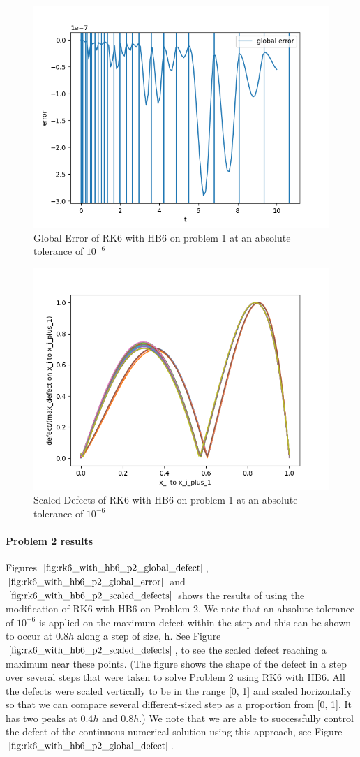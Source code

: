 \documentclass{article}
\begin{document}
\begin{figure}[H]
\centering
\includegraphics[width=0.7\linewidth]{./figures/rk6_with_hb6_p1_global_error}
\caption{Global Error of RK6 with HB6 on problem 1 at an absolute tolerance of $10^{-6}$}
\label{fig:rk6_with_hb6_p1_global_error}
\end{figure}

\begin{figure}[H]
\centering
\includegraphics[width=0.7\linewidth]{./figures/rk6_with_hb6_p1_scaled_defects}
\caption{Scaled Defects of RK6 with HB6 on problem 1 at an absolute tolerance of $10^{-6}$}
\label{fig:rk6_with_hb6_p1_scaled_defects}
\end{figure}

\paragraph{Problem 2 results}
Figures $\ref{fig:rk6_with_hb6_p2_global_defect}$, $\ref{fig:rk6_with_hb6_p2_global_error}$ and $\ref{fig:rk6_with_hb6_p2_scaled_defects}$ shows the results of using the modification of RK6 with HB6 on Problem 2. We note that an absolute tolerance of $10^{-6}$ is applied on the maximum defect within the step and this can be shown to occur at $0.8h$ along a step of size, h. See Figure $\ref{fig:rk6_with_hb6_p2_scaled_defects}$, to see the scaled defect reaching a maximum near these points. (The figure shows the shape of the defect in a step over several steps that were taken to solve Problem 2 using RK6 with HB6. All the defects were scaled vertically to be in the range [0, 1] and scaled horizontally so that we can compare several different-sized step as a proportion from [0, 1]. It has two peaks at $0.4h$ and $0.8h$.) We note that we are able to successfully control the defect of the continuous numerical solution using this approach, see Figure $\ref{fig:rk6_with_hb6_p2_global_defect}$. 
\end{document}
